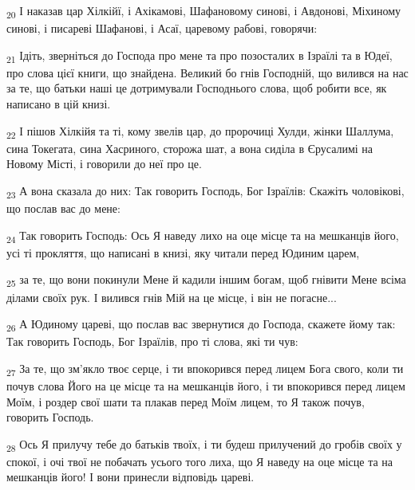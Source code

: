 \begin{tcolorbox}
\textsubscript{20} І наказав цар Хілкійї, і Ахікамові, Шафановому синові, і Авдонові, Міхиному синові, і писареві Шафанові, і Асаї, царевому рабові, говорячи:
\end{tcolorbox}
\begin{tcolorbox}
\textsubscript{21} Ідіть, зверніться до Господа про мене та про позосталих в Ізраїлі та в Юдеї, про слова цієї книги, що знайдена. Великий бо гнів Господній, що вилився на нас за те, що батьки наші це дотримували Господнього слова, щоб робити все, як написано в цій книзі.
\end{tcolorbox}
\begin{tcolorbox}
\textsubscript{22} І пішов Хілкійя та ті, кому звелів цар, до пророчиці Хулди, жінки Шаллума, сина Токегата, сина Хасриного, сторожа шат, а вона сиділа в Єрусалимі на Новому Місті, і говорили до неї про це.
\end{tcolorbox}
\begin{tcolorbox}
\textsubscript{23} А вона сказала до них: Так говорить Господь, Бог Ізраїлів: Скажіть чоловікові, що послав вас до мене:
\end{tcolorbox}
\begin{tcolorbox}
\textsubscript{24} Так говорить Господь: Ось Я наведу лихо на оце місце та на мешканців його, усі ті прокляття, що написані в книзі, яку читали перед Юдиним царем,
\end{tcolorbox}
\begin{tcolorbox}
\textsubscript{25} за те, що вони покинули Мене й кадили іншим богам, щоб гнівити Мене всіма ділами своїх рук. І вилився гнів Мій на це місце, і він не погасне...
\end{tcolorbox}
\begin{tcolorbox}
\textsubscript{26} А Юдиному цареві, що послав вас звернутися до Господа, скажете йому так: Так говорить Господь, Бог Ізраїлів, про ті слова, які ти чув:
\end{tcolorbox}
\begin{tcolorbox}
\textsubscript{27} За те, що зм'якло твоє серце, і ти впокорився перед лицем Бога свого, коли ти почув слова Його на це місце та на мешканців його, і ти впокорився перед лицем Моїм, і роздер свої шати та плакав перед Моїм лицем, то Я також почув, говорить Господь.
\end{tcolorbox}
\begin{tcolorbox}
\textsubscript{28} Ось Я прилучу тебе до батьків твоїх, і ти будеш прилучений до гробів своїх у спокої, і очі твої не побачать усього того лиха, що Я наведу на оце місце та на мешканців його! І вони принесли відповідь цареві.
\end{tcolorbox}
